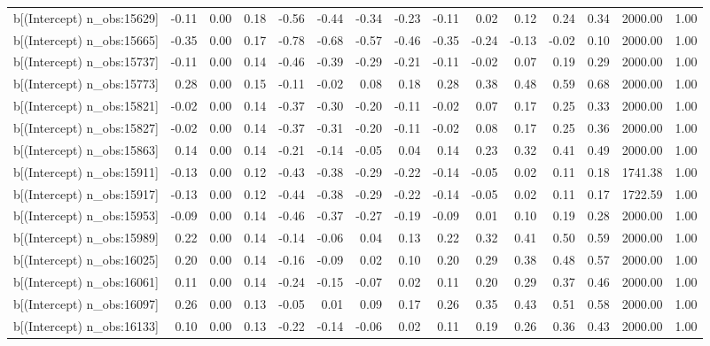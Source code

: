 \begin{table}[ht]
\begin{tabular}{rrrrrrrrrrrrrrr}
  b[(Intercept) n\_obs:15629] & -0.11 & 0.00 & 0.18 & -0.56 & -0.44 & -0.34 & -0.23 & -0.11 & 0.02 & 0.12 & 0.24 & 0.34 & 2000.00 & 1.00 \\ 
  b[(Intercept) n\_obs:15665] & -0.35 & 0.00 & 0.17 & -0.78 & -0.68 & -0.57 & -0.46 & -0.35 & -0.24 & -0.13 & -0.02 & 0.10 & 2000.00 & 1.00 \\ 
  b[(Intercept) n\_obs:15737] & -0.11 & 0.00 & 0.14 & -0.46 & -0.39 & -0.29 & -0.21 & -0.11 & -0.02 & 0.07 & 0.19 & 0.29 & 2000.00 & 1.00 \\ 
  b[(Intercept) n\_obs:15773] & 0.28 & 0.00 & 0.15 & -0.11 & -0.02 & 0.08 & 0.18 & 0.28 & 0.38 & 0.48 & 0.59 & 0.68 & 2000.00 & 1.00 \\ 
  b[(Intercept) n\_obs:15821] & -0.02 & 0.00 & 0.14 & -0.37 & -0.30 & -0.20 & -0.11 & -0.02 & 0.07 & 0.17 & 0.25 & 0.33 & 2000.00 & 1.00 \\ 
  b[(Intercept) n\_obs:15827] & -0.02 & 0.00 & 0.14 & -0.37 & -0.31 & -0.20 & -0.11 & -0.02 & 0.08 & 0.17 & 0.25 & 0.36 & 2000.00 & 1.00 \\ 
  b[(Intercept) n\_obs:15863] & 0.14 & 0.00 & 0.14 & -0.21 & -0.14 & -0.05 & 0.04 & 0.14 & 0.23 & 0.32 & 0.41 & 0.49 & 2000.00 & 1.00 \\ 
  b[(Intercept) n\_obs:15911] & -0.13 & 0.00 & 0.12 & -0.43 & -0.38 & -0.29 & -0.22 & -0.14 & -0.05 & 0.02 & 0.11 & 0.18 & 1741.38 & 1.00 \\ 
  b[(Intercept) n\_obs:15917] & -0.13 & 0.00 & 0.12 & -0.44 & -0.38 & -0.29 & -0.22 & -0.14 & -0.05 & 0.02 & 0.11 & 0.17 & 1722.59 & 1.00 \\ 
  b[(Intercept) n\_obs:15953] & -0.09 & 0.00 & 0.14 & -0.46 & -0.37 & -0.27 & -0.19 & -0.09 & 0.01 & 0.10 & 0.19 & 0.28 & 2000.00 & 1.00 \\ 
  b[(Intercept) n\_obs:15989] & 0.22 & 0.00 & 0.14 & -0.14 & -0.06 & 0.04 & 0.13 & 0.22 & 0.32 & 0.41 & 0.50 & 0.59 & 2000.00 & 1.00 \\ 
  b[(Intercept) n\_obs:16025] & 0.20 & 0.00 & 0.14 & -0.16 & -0.09 & 0.02 & 0.10 & 0.20 & 0.29 & 0.38 & 0.48 & 0.57 & 2000.00 & 1.00 \\ 
  b[(Intercept) n\_obs:16061] & 0.11 & 0.00 & 0.14 & -0.24 & -0.15 & -0.07 & 0.02 & 0.11 & 0.20 & 0.29 & 0.37 & 0.46 & 2000.00 & 1.00 \\ 
  b[(Intercept) n\_obs:16097] & 0.26 & 0.00 & 0.13 & -0.05 & 0.01 & 0.09 & 0.17 & 0.26 & 0.35 & 0.43 & 0.51 & 0.58 & 2000.00 & 1.00 \\ 
  b[(Intercept) n\_obs:16133] & 0.10 & 0.00 & 0.13 & -0.22 & -0.14 & -0.06 & 0.02 & 0.11 & 0.19 & 0.26 & 0.36 & 0.43 & 2000.00 & 1.00 \\ 

\end{tabular}
\end{table}
